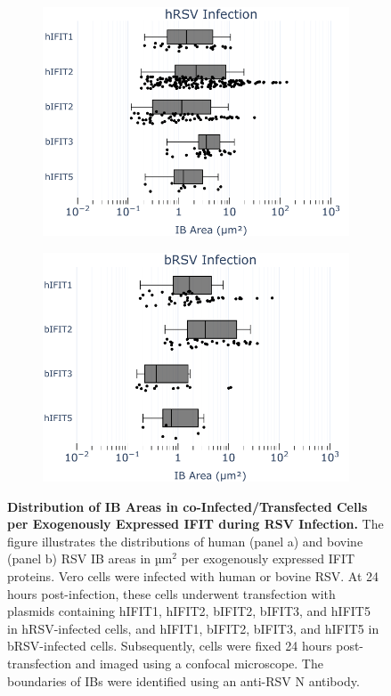 \begin{figure}
    \begin{subfigure}{0.495\textwidth}
        \caption{}
        \includegraphics[width=1\linewidth]{09. Chapter 4/Figs/02. Overexpression/01. sizes-oe-hrsv.pdf} 
    \end{subfigure}
    \begin{subfigure}{0.495\textwidth}
        \caption{}
        \includegraphics[width=1\linewidth]{09. Chapter 4/Figs/02. Overexpression/02. sizes-oe-brsv.pdf}
    \end{subfigure}
    \caption[Distribution of IB Areas in co-Infected/Transfected Cells per Exogenously Expressed IFIT during RSV Infection.]{\textbf{Distribution of IB Areas in co-Infected/Transfected Cells per Exogenously Expressed IFIT during RSV Infection.} The figure illustrates the distributions of human (panel a) and bovine (panel b) RSV IB areas in \(\mbox{µm}^2\) per exogenously expressed IFIT proteins. Vero cells were infected with human or bovine RSV. At 24 hours post-infection, these cells underwent transfection with plasmids containing hIFIT1, hIFIT2, bIFIT2, bIFIT3, and hIFIT5 in hRSV-infected cells, and hIFIT1, bIFIT2, bIFIT3, and hIFIT5 in bRSV-infected cells. Subsequently, cells were fixed 24 hours post-transfection and imaged using a confocal microscope. The boundaries of IBs were identified using an anti-RSV N antibody.}

\end{figure}
